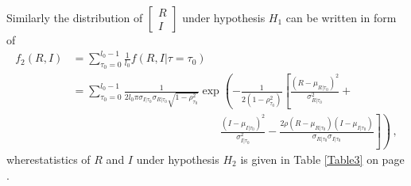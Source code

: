 Similarly the distribution of  
$\begin{bmatrix}
  R \\
  I
\end{bmatrix}$
under hypothesis $H_1$ can be written in form of 
\begin{equation}
  \begin{split}
	f_2(R, I) &= \sum_{\tau_0 = 0}^{l_0-1} \frac{1}{l_0}f(R, I|\tau=\tau_0)\\
	&= \sum_{\tau_0 = 0}^{l_0-1}\frac{1}{2l_0\pi\sigma_{I|\tau_0}\sigma_{R|\tau_0}\sqrt{1 - \rho_{\tau_0}^2}}\exp\left( -\frac{1}{2(1-\rho_{\tau_0}^2)}\left[ \frac{(R-\mu_{R|\tau_0})^2}{\sigma_{R|\tau_0}^2} + \right.\right.\\
	& \left. \left. \;\;\;\;\;\;\;\;\;\;\;\;\;\;\;\; \;\;\;\;\;\;\;\;\;\;\;\;\;\;\;\; \;\;\;\;\;\;\;\;\;\;\;\;\;\;\;\; \frac{(I-\mu_{I|\tau_0})^2}{\sigma_{I|\tau_0}^2} - \frac{2\rho(R-\mu_{R|\tau_0})(I-\mu_{I|\tau_0})}{\sigma_{R|\tau_0}\sigma_{I|\tau_0}}\right] \right)\,,
  \end{split}
  \label{f_1underH1}
\end{equation}
wherestatistics of $R$ and $I$ under hypothesis $H_2$ is given in Table \ref{Table3} on page \pageref{Table3}. 


